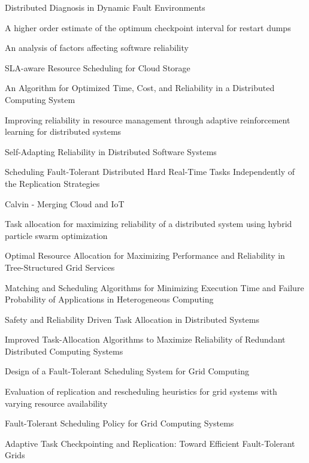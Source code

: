\documentclass{cslthse-msc}
\begin{document}
\begin{thebibliography}{50}
Distributed Diagnosis in Dynamic Fault Environments

A higher order estimate of the optimum checkpoint interval for restart dumps

An analysis of factors affecting software reliability

SLA-aware Resource Scheduling for Cloud Storage

An Algorithm for Optimized Time, Cost, and Reliability in a Distributed Computing System

Improving reliability in resource management through adaptive reinforcement learning for distributed systems

Self-Adapting Reliability in Distributed Software Systems

Scheduling Fault-Tolerant Distributed Hard Real-Time Tasks Independently of the Replication Strategies

Calvin - Merging Cloud and IoT

Task allocation for maximizing reliability of a distributed system using hybrid particle swarm optimization

Optimal Resource Allocation for Maximizing Performance and Reliability in Tree-Structured Grid Services 

Matching and Scheduling Algorithms for Minimizing Execution Time and Failure Probability of Applications in Heterogeneous Computing

Safety and Reliability Driven Task Allocation in Distributed Systems

Improved Task-Allocation Algorithms to Maximize Reliability of Redundant Distributed Computing Systems 

Design of a Fault-Tolerant Scheduling System for Grid Computing

Evaluation of replication and rescheduling heuristics for grid systems with varying resource availability

Fault-Tolerant Scheduling Policy for Grid Computing Systems

Adaptive Task Checkpointing and Replication: Toward Efficient Fault-Tolerant Grids


\end{thebibliography}
\end{document}
